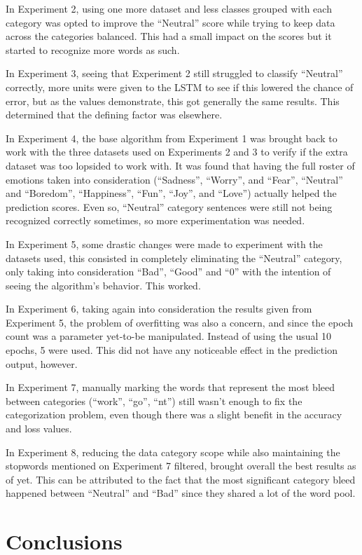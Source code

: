 \documentclass[review]{elsarticle} %
\begin{document}
In Experiment 2, using one more dataset and less classes grouped with each category was opted to improve the ``Neutral'' score while trying to keep data across the categories balanced. This had a small impact on the scores but it started to recognize more words as such.

In Experiment 3, seeing that Experiment 2 still struggled to classify ``Neutral'' correctly, more units were given to the LSTM to see if this lowered the chance of error, but as the values demonstrate, this got generally the same results. This determined that the defining factor was elsewhere.

In Experiment 4, the base algorithm from Experiment 1 was brought back to work with the three datasets used on Experiments 2 and 3 to verify if the extra dataset was too lopsided to work with. It was found that having the full roster of emotions taken into consideration (``Sadness'', ``Worry'', and ``Fear'', ``Neutral'' and ``Boredom'', ``Happiness'', ``Fun'', ``Joy'', and ``Love'') actually helped the prediction scores. Even so, ``Neutral'' category sentences were still not being recognized correctly sometimes, so more experimentation was needed.

In Experiment 5, some drastic changes were made to experiment with the datasets used, this consisted in completely eliminating the ``Neutral'' category, only taking into consideration ``Bad'', ``Good'' and ``0'' with the intention of seeing the algorithm's behavior. This worked. 

In Experiment 6, taking again into consideration the results given from Experiment 5, the problem of overfitting was also a concern, and since the epoch count was a parameter yet-to-be manipulated. Instead of using the usual 10 epochs, 5 were used. This did not have any noticeable effect in the prediction output, however.

In Experiment 7, manually marking the words that represent the most bleed between categories (``work'', ``go'', ``nt'') still wasn't enough to fix the categorization problem, even though there was a slight benefit in the accuracy and loss values.

In Experiment 8, reducing the data category scope while also maintaining the stopwords mentioned on Experiment 7 filtered, brought overall the best results as of yet. This can be attributed to the fact that the most significant category bleed happened between ``Neutral'' and ``Bad'' since they shared a lot of the word pool.

\section{Conclusions}
\end{document}
